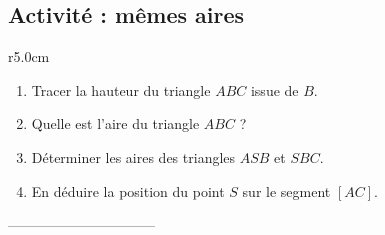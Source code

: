 
\subsection*{Activité : mêmes aires}

\begin{wrapfigure}{r}{5.0cm}
   \vspace{-0.5cm}        %
   \centering
   
\end{wrapfigure}

\begin{enumerate}
    \item
        Tracer la hauteur du triangle \( ABC\) issue de \( B\).
    \item
        Quelle est l'aire du triangle \( ABC\) ?
    \item
        Déterminer les aires des triangles \( ASB\) et \( SBC\).
    \item
        En déduire la position du point \( S\) sur le segment \( [AC]\).
\end{enumerate}

\vspace{3cm}
--------------------------------
